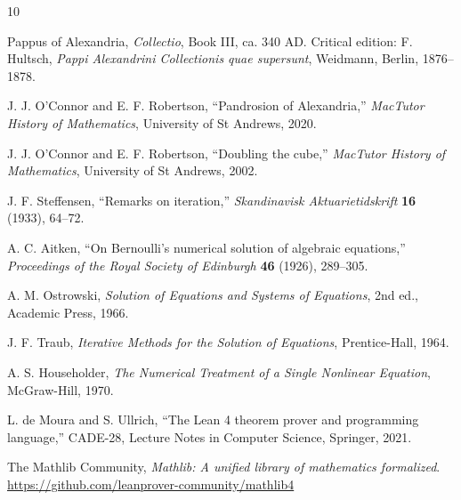 \documentclass[11pt,a4paper]{article}
\theoremstyle{plain}
\theoremstyle{definition}
\theoremstyle{remark}
\begin{document}
\begin{thebibliography}{10}

Pappus of Alexandria,
\textit{Collectio}, Book III, ca. 340 AD.
Critical edition: F. Hultsch, \textit{Pappi Alexandrini Collectionis quae supersunt},
Weidmann, Berlin, 1876--1878.

J. J. O'Connor and E. F. Robertson,
``Pandrosion of Alexandria,''
\textit{MacTutor History of Mathematics}, University of St Andrews, 2020.

J. J. O'Connor and E. F. Robertson,
``Doubling the cube,''
\textit{MacTutor History of Mathematics}, University of St Andrews, 2002.

J. F. Steffensen,
``Remarks on iteration,''
\textit{Skandinavisk Aktuarietidskrift} \textbf{16} (1933), 64--72.

A. C. Aitken,
``On Bernoulli's numerical solution of algebraic equations,''
\textit{Proceedings of the Royal Society of Edinburgh} \textbf{46} (1926), 289--305.

A. M. Ostrowski,
\textit{Solution of Equations and Systems of Equations},
2nd ed., Academic Press, 1966.

J. F. Traub,
\textit{Iterative Methods for the Solution of Equations},
Prentice-Hall, 1964.

A. S. Householder,
\textit{The Numerical Treatment of a Single Nonlinear Equation},
McGraw-Hill, 1970.

L. de Moura and S. Ullrich,
``The Lean 4 theorem prover and programming language,''
CADE-28, Lecture Notes in Computer Science, Springer, 2021.

The Mathlib Community,
\textit{Mathlib: A unified library of mathematics formalized}.
\url{https://github.com/leanprover-community/mathlib4}

\end{thebibliography}
\end{document}
